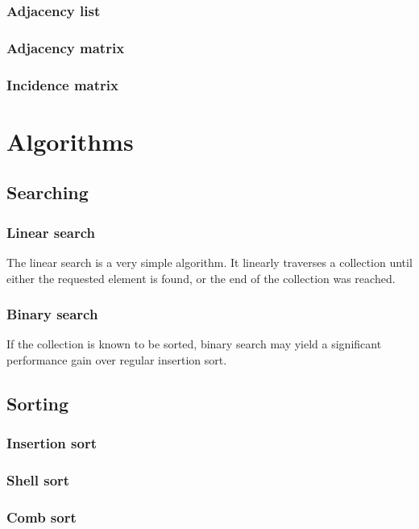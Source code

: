 \documentclass{article}
\begin{document}
\subsubsection{Adjacency list}


\subsubsection{Adjacency matrix}
\subsubsection{Incidence matrix}

\newpage

\section{Algorithms}
\subsection{Searching}
\subsubsection{Linear search}
The linear search is a very simple algorithm. It linearly traverses a collection until either the requested
element is found, or the end of the collection was reached.

\subsubsection{Binary search}
If the collection is known to be sorted, binary search may yield a significant performance gain over regular insertion sort.

\newpage

\subsection{Sorting}
\subsubsection{Insertion sort}


\subsubsection{Shell sort}

\subsubsection{Comb sort}
\end{document}
